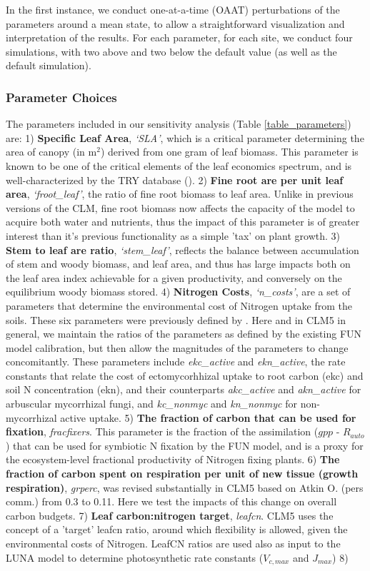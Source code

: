 \documentclass[draft,linenumbers]{agujournal}
\begin{document}
In the first instance, we conduct one-at-a-time (OAAT) perturbations of the parameters around a mean state, to allow a straightforward visualization and interpretation of the results. For each parameter, for each site, we conduct four simulations, with two above and two below the default value (as well as the default simulation).  

\subsubsection{Parameter Choices}
The parameters included in our sensitivity analysis (Table \ref{table_parameters}) are: 1) \textbf{Specific Leaf Area}, \emph{`SLA'}, which is a critical parameter determining the area of canopy (in m$^{2}$) derived from one gram of leaf biomass. This parameter is known to be one of the critical elements of the leaf economics spectrum, and is well-characterized by the TRY database (\cite{kattge2011}). 2) \textbf{Fine root are per unit leaf area}, \emph{`froot\_leaf'}, the ratio of fine root biomass to leaf area. Unlike in previous versions of the CLM, fine root biomass now affects the capacity of the model to acquire both water and nutrients, thus the impact of this parameter is of greater interest than it's previous functionality as a simple 'tax' on plant growth. 3) \textbf{Stem to leaf are ratio}, \emph{`stem\_leaf'}, reflects the balance between accumulation of stem and woody biomass, and leaf area, and thus has large impacts both on the leaf area index achievable for a given productivity, and conversely on the equilibrium woody biomass stored. 4) \textbf{Nitrogen Costs}, \emph{`n\_costs'}, are a set of parameters that determine the environmental cost of Nitrogen uptake from the soils. These six parameters were previously defined by \cite{brzostek2014}. Here and in CLM5 in general, we maintain the ratios of the parameters as defined by the existing FUN model calibration, but then allow the magnitudes of the parameters to change concomitantly. These parameters include \emph{ekc\_active} and  \emph{ekn\_active}, the rate constants that relate the cost of ectomycorhhizal uptake to root carbon (ekc) and soil N concentration (ekn), and their counterparts \emph{akc\_active} and  \emph{akn\_active} for arbuscular mycorrhizal fungi, and  \emph{kc\_nonmyc} and  \emph{kn\_nonmyc} for non-mycorrhizal active uptake. 5) \textbf{The fraction of carbon that can be used for fixation}, \emph{fracfixers}. This parameter is the fraction of the assimilation ($gpp$ - $R_{auto}$) that can be used for symbiotic N fixation by the FUN model, and is a proxy for the ecosystem-level fractional productivity of Nitrogen fixing plants. 6) \textbf{The fraction of carbon spent on respiration per unit of new tissue (growth respiration)}, \emph{grperc}, was revised substantially in CLM5 based on Atkin O. (pers comm.) from 0.3 to 0.11. Here we test the impacts of this change on overall carbon budgets. 7) \textbf{Leaf carbon:nitrogen target}, \emph{leafcn}. CLM5 uses the concept of a 'target' leafcn ratio, around which flexibility is allowed, given the environmental costs of Nitrogen. LeafCN ratios are used also as input to the LUNA model to determine photosynthetic rate constants ($V_{c,max}$ and $J_{max}$) 8)  
\end{document}

